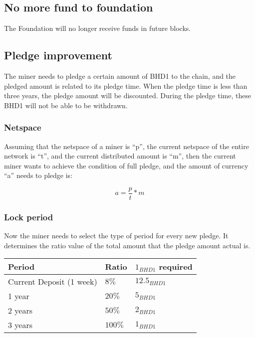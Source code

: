 \subsection{No more fund to foundation}
\begin{flushleft}
    The Foundation will no longer receive funds in future blocks.
\end{flushleft}
\subsection{Pledge improvement}
\begin{flushleft}
    The miner needs to pledge a certain amount of BHD1 to the chain, and the pledged amount is related to its pledge time. When the pledge time is less than three years, the pledge amount will be discounted. During the pledge time, these BHD1 will not be able to be withdrawn.
\end{flushleft}
\subsubsection{Netspace}
\begin{flushleft}
    Assuming that the netspace of a miner is ``p'', the current netspace of the entire network is ``t'', and the current distributed amount is ``m'', then the current miner wants to achieve the condition of full pledge, and the amount of currency ``a'' needs to pledge is:
\end{flushleft}
\begin{equation}
    a = \frac{p}{t} * m
\end{equation}
\subsubsection{Lock period}
\begin{flushleft}
    Now the miner needs to select the type of period for every new pledge. It determines the ratio value of the total amount that the pledge amount actual is.
\end{flushleft}
\begin{tabular}{ |p{5cm}|p{3cm}|p{3.5cm}| }
    \hline
    \rowcolor{lightgray}\textbf{Period} & \textbf{Ratio} & \textbf{$1_{BHD1}$ required} \\[5pt]
    \hline
    Current Deposit (1 week) & $8\%$ & $12.5_{BHD1}$ \\[5pt]
    \rowcolor{lightgray!30} 1 year & $20\%$ & $5_{BHD1}$ \\[5pt]
    2 years & $50\%$ & $2_{BHD1}$ \\[5pt]
    \rowcolor{lightgray!30} 3 years & $100\%$ & $1_{BHD1}$ \\[5pt]
    \hline
\end{tabular}
